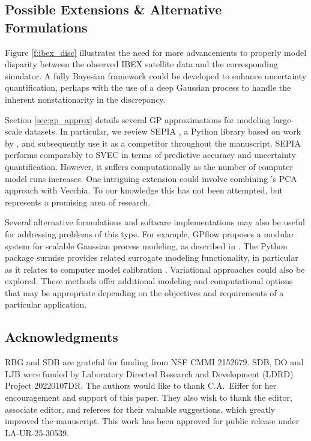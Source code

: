 \documentclass[11pt]{article}
\begin{document}
\subsection*{Possible Extensions \& Alternative Formulations}

{\color{red}Figure \ref{f:ibex_disc} illustrates the need for more
advancements to properly model disparity between the observed IBEX satellite
data and the corresponding simulator. A fully Bayesian framework could be
developed to enhance uncertainty quantification, perhaps with the use of a
deep Gaussian process to handle the inherent nonstationarity in the
discrepancy.}

{\color{red}Section \ref{sec:gp_approx} details several GP approximations for
modeling large-scale datasets. In particular, we review SEPIA
\citep{gattiker2020lanl}, a {\sf Python} library based on work by
\citet{higdoncalib2008}, and subsequently use it as a competitor throughout
the manuscript. SEPIA performs comparably to SVEC in terms of predictive
accuracy and uncertainty quantification. However, it suffers computationally
as the number of computer model runs increases. One intriguing extension could
involve combining \citeauthor{higdoncalib2008}'s PCA approach with Vecchia. To
our knowledge this has not been attempted, but represents a promising area of
research.}

{\color{red}Several alternative formulations and software implementations may
also be useful for addressing problems of this type. For example, {\sf GPflow}
proposes a modular system for scalable Gaussian process modeling, as described
in \citet{van2020framework}. The {\sf Python} package {\sf surmise}
\citep{surmise2025} provides related surrogate modeling functionality, in
particular as it relates to computer model calibration
\citep{chan2024constructing,surer2022uncertainty}. Variational approaches
\citep{opper2009variational,hensman2015scalable} could also be explored. These
methods offer additional modeling and computational options that may be
appropriate depending on the objectives and requirements of a particular
application.}

\subsection*{Acknowledgments}

RBG and SDB are grateful for funding from NSF CMMI 2152679. SDB, DO and LJB
were funded by Laboratory Directed Research and Development (LDRD) Project
20220107DR. The authors would like to thank C.A.~Eiffer for her encouragement
and support of this paper. {\color{red}They also wish to thank the editor,
associate editor, and referees for their valuable suggestions, which greatly
improved the manuscript.} This work has been approved for public release under
LA-UR-25-30539.
\end{document}
